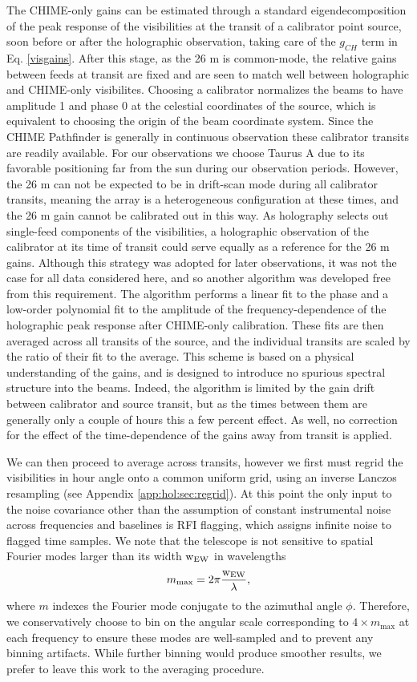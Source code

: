 The CHIME-only gains can be estimated through a standard eigendecomposition of the peak response of the visibilities at the transit of a calibrator point source, soon before or after the holographic observation, taking care of the $g_{CH}$ term in Eq. \ref{visgains}. After this stage, as the 26 m is common-mode, the relative gains between feeds at transit are fixed and are seen to match well between holographic and CHIME-only visibilites. Choosing a calibrator normalizes the beams to have amplitude 1 and phase 0 at the celestial coordinates of the source, which is equivalent to choosing the origin of the beam coordinate system. Since the CHIME Pathfinder is generally in continuous observation these calibrator transits are readily available. For our observations we choose Taurus A due to its favorable positioning far from the sun during our observation periods. However, the 26 m can not be expected to be in drift-scan mode during all calibrator transits, meaning the array is a heterogeneous configuration at these times, and the 26 m gain cannot be calibrated out in this way. As holography selects out single-feed components of the visibilities, a holographic observation of the calibrator at its time of transit could serve equally as a reference for the 26 m gains. Although this strategy was adopted for later observations, it was not the case for all data considered here, and so another algorithm was developed free from this requirement. The algorithm performs a linear fit to the phase and a low-order polynomial fit to the amplitude of the frequency-dependence of the holographic peak response after CHIME-only calibration. These fits are then averaged across all transits of the source, and the individual transits are scaled by the ratio of their fit to the average. This scheme is based on a physical understanding of the gains, and is designed to introduce no spurious spectral structure into the beams. Indeed, the algorithm is limited by the gain drift between calibrator and source transit, but as the times between them are generally only a couple of hours this a few percent effect. As well, no correction for the effect of the time-dependence of the gains away from transit is applied.

We can then proceed to average across transits, however we first must regrid the visibilities in hour angle onto a common uniform grid, using an inverse Lanczos resampling (see Appendix \ref{app:hol:sec:regrid}). At this point the only input to the noise covariance other than the assumption of constant instrumental noise across frequencies and baselines is RFI flagging, which assigns infinite noise to flagged time samples. We note that the telescope is not sensitive to spatial Fourier modes larger than its width ${\rm w_{EW}}$ in wavelengths
\begin{equation}
m_{\rm max} = 2\pi \frac{\rm w_{EW}}{\lambda},
\end{equation}
where $m$ indexes the Fourier mode conjugate to the azimuthal angle $\phi$. Therefore, we conservatively choose to bin on the angular scale corresponding to $4\times m_{\max}$ at each frequency to ensure these modes are well-sampled and to prevent any binning artifacts. While further binning would produce smoother results, we prefer to leave this work to the averaging procedure. 


